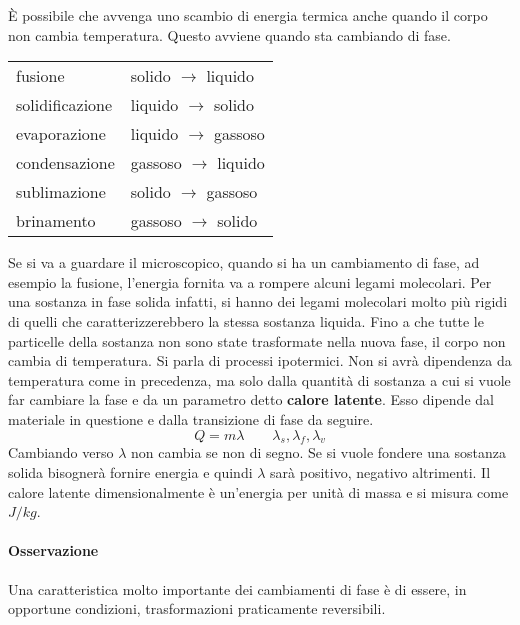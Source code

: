 \documentclass[10pt,a4paper]{book}
\begin{document}
È possibile che avvenga uno scambio di energia termica anche quando il corpo non cambia temperatura. Questo avviene quando sta cambiando di fase.
\begin{table}[htpb]
	\centering
	\begin{tabular}{ll}
		fusione & solido $\to$ liquido \\
		solidificazione & liquido $\to$ solido \\
		evaporazione & liquido $\to$ gassoso \\
		condensazione & gassoso $\to$ liquido \\
		sublimazione & solido $\to$ gassoso \\
		brinamento & gassoso $\to$ solido \\
	\end{tabular}
\end{table}
Se si va a guardare il microscopico, quando si ha un cambiamento di fase, ad esempio la fusione, l'energia fornita va a rompere alcuni legami molecolari. Per una sostanza in fase solida infatti, si hanno dei legami molecolari molto più rigidi di quelli che caratterizzerebbero la stessa sostanza liquida. Fino a che tutte le particelle della sostanza non sono state trasformate nella nuova fase, il corpo non cambia di temperatura. Si parla di processi ipotermici.
Non si avrà dipendenza da temperatura come in precedenza, ma solo dalla quantità di sostanza a cui si vuole far cambiare la fase e da un parametro detto \textbf{calore latente}. Esso dipende dal materiale in questione e dalla transizione di fase da seguire.
\[
	Q = m \lambda \qquad \lambda_s,\lambda_f,\lambda_v
\]
Cambiando verso $\lambda$ non cambia se non di segno. Se si vuole fondere una sostanza solida bisognerà fornire energia e quindi $\lambda$ sarà positivo, negativo altrimenti. Il calore latente dimensionalmente è un'energia per unità di massa e si misura come $J/kg$.

\paragraph{Osservazione} Una caratteristica molto importante dei cambiamenti di fase è di essere, in opportune condizioni, trasformazioni praticamente reversibili.
\end{document}
